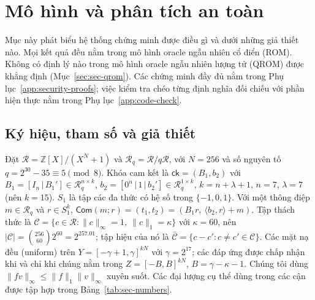 %
%

\providecommand{\Rq}{\mathcal{R}_q}
\providecommand{\norm}[1]{\lVert #1 \rVert}
\providecommand{\Adv}{\mathsf{Adv}}
\providecommand{\pid}{\mathit{pid}}
\providecommand{\Cset}{\mathcal{C}}
\providecommand{\Cdiff}{\bar{\mathcal{C}}}
\providecommand{\Com}{\mathsf{Com}}
\providecommand{\vid}{\mathsf{vid}}
\providecommand{\Hfs}{H_{\mathsf{fs}}}
\providecommand{\Stmt}{\mathsf{Stmt}}
\providecommand{\Canon}{\mathsf{Canon}}
\providecommand{\MSIS}{\textsf{M-SIS}}
\providecommand{\MLWE}{\textsf{M-LWE}}
\providecommand{\epszk}{\varepsilon_{\mathsf{zk}}}
\providecommand{\Amax}{A_{\max}}

\section{Mô hình và phân tích an toàn}
\label{sec:security-model}

Mục này phát biểu hệ thống chứng minh được điều gì và dưới những giả thiết nào.
Mọi kết quả đều nằm trong mô hình oracle ngẫu nhiên cổ điển (ROM). Không có định
lý nào trong mô hình oracle ngẫu nhiên lượng tử (QROM) được khẳng định
(Mục~\ref{sec:sec-qrom}). Các chứng minh đầy đủ nằm trong
Phụ lục~\ref{app:security-proofs}; việc kiểm tra chéo từng định nghĩa đối chiếu
với phần hiện thực nằm trong Phụ lục~\ref{app:code-check}.

\subsection{Ký hiệu, tham số và giả thiết}
\label{sec:sec-notation}

Đặt $\mathcal R=\mathbb Z[X]/(X^N+1)$ và $\Rq=\mathcal R/q\mathcal R$, với
$N=256$ và số nguyên tố $q=2^{30}-35\equiv5\pmod 8$. Khóa cam kết là
$\mathsf{ck}=(B_1,b_2)$ với $B_1=[I_n\,|\,B_1']\in\Rq^{n\times k}$,
$b_2=[0^n\,|\,1\,|\,b_2']\in\Rq^{1\times k}$, $k=n+\lambda+1$, $n=7$, $\lambda=7$ (nên $k=15$).
$S_1$ là tập các đa thức có hệ số trong $\{-1,0,1\}$. Với một thông điệp
$m\in\Rq$ và $r\in S_1^k$,
$\Com(m;r)=(t_1,t_2)=(B_1r,\ \langle b_2,r\rangle+m)$. Tập thách thức là
$\Cset=\{c\in\mathcal R:\norm{c}_\infty=1,\ \norm{c}_1=\kappa\}$ với
$\kappa=60$, nên $|\Cset|=\binom{256}{60}2^{60}=2^{257.01}$; tập hiệu của nó
là $\Cdiff=\{c-c':c\neq c'\in\Cset\}$. Các mặt nạ đều (uniform) trên
$Y=[-\gamma+1,\gamma]^{kN}$ với $\gamma=2^{17}$; các đáp ứng được chấp nhận khi
và chỉ khi chúng nằm trong $Z=[-B,B]^{kN}$, $B=\gamma-\kappa-1$. Chúng tôi dùng
$\norm{fv}_\infty\le\norm{f}_1\norm{v}_\infty$ xuyên suốt. Các đại lượng cụ thể
dùng trong các cận được tập hợp trong Bảng~\ref{tab:sec-numbers}.

